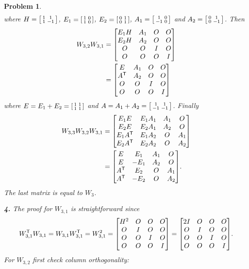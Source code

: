 \documentclass{article}
\newcommand{\subno}[1]{\par\noindent\textbf{#1}}
\theoremstyle{pprop}
\newtheorem{problem}{Problem}[section]
\begin{document}
\begin{problem}
\begin{align*}
\end{align*}
where $H=\smqty[1 & 1 \\ 1 & -1]$, $E_1=\smqty[1 & 0 \\ 1 & 0]$,  $E_2=\smqty[0 & 1 \\ 0 & 1]$, $A_1=\smqty[1 & 0 \\ -1 & 0]$ and
$A_2=\smqty[0 & 1 \\ 0 & -1 ]$. 
Then 
\begin{align*}
W_{3,2}W_{3,1} & =
\mqty[E_1 H & A_1 & O & O \\ 
E_2H  & A_2 & O & O \\
O & O & I & O \\
O & O & O & I \\
] \\
& =
\mqty[E & A_1 & O & O \\ 
A^{\sf T} & A_2 & O & O \\
O & O & I & O \\
O & O & O & I \\
] 
\end{align*}
where $E=E_1+E_2=\smqty[1 & 1 \\ 1 & 1]$ and $A=A_1+A_2=\smqty[1 & 1 \\ -1 & -1]$.
Finally 
\begin{align*}
W_{3,3}W_{3,2}W_{3,1} & =
\mqty[E_1E & E_1A_1 & A_1 & O \\  
E_2E & E_2A_1 & A_2 & O \\
E_1A^{\sf T} & E_1A_2 & O & A_1 \\
E_2A^{\sf T} & E_2A_2 & O & A_2 \\
] \\
& =
\mqty[E & E_1 & A_1 & O \\  
E & -E_1 & A_2 & O \\
A^{\sf T} & E_2 & O & A_1 \\
A^{\sf T} & -E_2 & O & A_2 \\
] .
\end{align*}
The last matrix is equal to $W_3$.
\subno{4.} The proof for $W_{3,1}$ is straightforward since 
\[
W_{3,1}^{\sf T}W_{3,1}=W_{3,1}W_{3,1}^{\sf T}=W_{3,1}^2 =
\mqty[H^2 & O & O & O \\ O & I & O & O \\ O & O & I & O \\ O & O & O & I]
=
\mqty[2I & O & O & O \\ O & I & O & O \\ O & O & I & O \\ O & O & O & I].
\]
For $W_{3,2}$ first check column orthogonality:

\end{problem}
\end{document}
